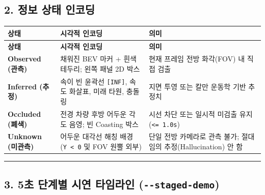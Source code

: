 \documentclass[10.5pt,a4paper]{article}
\begin{document}
\subsection{2. 정보 상태 인코딩}


\begin{footnotesize}
\setlength{\tabcolsep}{4pt}
\setlength{\LTleft}{0pt}\setlength{\LTright}{0pt}
\begin{longtable}{>{\raggedright\arraybackslash}p{} >{\raggedright\arraybackslash}p{} >{\raggedright\arraybackslash}p{}}
\toprule
\textbf{상태} & \textbf{시각적 인코딩} & \textbf{의미} \\
\midrule
\endfirsthead
\toprule
\textbf{상태} & \textbf{시각적 인코딩} & \textbf{의미} \\
\midrule
\endhead
\bottomrule
\endfoot
\textbf{Observed (관측)} & 채워진 BEV 마커 + 흰색 테두리; 왼쪽 패널 2D 박스 & 현재 프레임 전방 화각(FOV) 내 직접 검출 \\
\textbf{Inferred (추정)} & 속이 빈 윤곽선 \texttt{[INF]}, 속도 화살표, 미래 타원, 충돌 링 & 지면 투영 또는 칼만 운동학 기반 추정치 \\
\textbf{Occluded (폐색)} & 전경 차량 후방 어두운 각도 음영; 빈 Coasting 박스 & 시선 차단 또는 일시적 미검출 유지 (\texttt{<= 1.\allowbreak{}0s}) \\
\textbf{Unknown (미관측)} & 어두운 대각선 해칭 배경 (\texttt{Y < 0} 및 FOV 원뿔 외부) & 단일 전방 카메라로 관측 불가; 절대 임의 추정(Hallucination) 안 함 \\
\end{longtable}
\end{footnotesize}


\par\noindent\rule{\textwidth}{0.4pt}\par\medskip

\subsection{3. 5초 단계별 시연 타임라인 (\texttt{-\allowbreak{}-\allowbreak{}staged-\allowbreak{}demo})}
\end{document}
